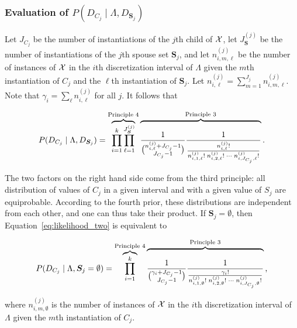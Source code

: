 \subsubsection{Evaluation of $P(D_{C_j} \mid \Lambda, D_{\bm{S}_j})$}
Let $J_{C_j}$ be the number of instantiations of the $j$th child of $\mathcal{X}$, let $J_{\bm{S}}^{(j)}$ be the number of instantiations of the $j$th spouse set $\bm{S}_j$, and let $n^{(j)}_{i,m,\ell}$ be the number of instances of $\mathcal{X}$ in the $i$th discretization interval of $\Lambda$ given the $m$th instantiation of $C_j$ and the $\ell$th instantiation of $\bm{S}_j$.
Let ${n^{(j)}_{i,\ell} = \sum_{m=1}^{J_j} n^{(j)}_{i,m,\ell}}$.
Note that ${\gamma_i = \sum_{\ell} n^{(j)}_{i,\ell}}$ for all $j$.
It follows that

\begin{equation}
  \label{eq:likelihood_two}
  P(D_{C_j} \mid \Lambda, D_{\bm{S}_j}) =
  \overbrace{\prod_{i=1}^{k} \prod_{\ell=1}^{J_{\bm{S}}^{(j)}}}^{\text{Principle 4}}
    \overbrace{\rule{0pt}{2.3em}
      {
        \frac{1}{
          {{n^{(j)}_{i,\ell} + J_{C_j} - 1}\choose{J_{C_j}-1}}}
        }
        {\frac{
          1
        }{
          \frac{
            {n^{(j)}_{i,\ell}}!
          }{
            {n^{(j)}_{i,1,\ell}!} \; {n^{(j)}_{i,2,\ell}!} \; \cdots \; {n^{(j)}_{i,J_{C_j},\ell}!}
          }
        }
      }
    }^{\text{Principle 3}}
    \text{.}
\end{equation}

The two factors on the right hand side come from the third principle: all distribution of values of $C_j$ in a given interval and with a given value of $S_j$ are equiprobable.
According to the fourth prior, these distributions are independent from each other, and one can thus take their product.
If $\bm{S}_j = \emptyset$, then Equation~\ref{eq:likelihood_two} is equivalent to

\begin{equation}
  \label{eq:likelihood_three}
  P(D_{C_j} \mid \Lambda, \bm{S}_j = \emptyset) =
  \overbrace{\prod_{i=1}^{k}}^{\text{Principle 4}}
  \overbrace{\rule{0pt}{2.3em}{
    {1}\over{
      {\gamma_i + J_{C_j} - 1}\choose{J_{C_j}-1}}
    }
    {{1}\over{
      {{\gamma_i}!} \over {
        {n^{(j)}_{i,1,\emptyset}!} \; {n^{(j)}_{i,2,\emptyset}!} \; \cdots \; {n^{(j)}_{i,J_{C_j},\emptyset} !}
      }
    }
  }}^{\text{Principle 3}}
  \text{,}
\end{equation}

\noindent
where $n^{(j)}_{i,m,\emptyset}$ is the number of instances of $\mathcal{X}$ in the $i$th discretization interval of $\Lambda$ given the $m$th instantiation of $C_j$.

